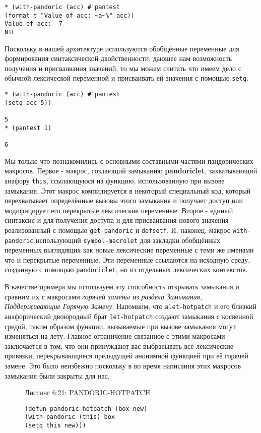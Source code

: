 \begin{verbatim}
* (with-pandoric (acc) #'pantest
(format t "Value of acc: ~a~%" acc))
Value of acc: -7
NIL
\end{verbatim}

Поскольку в нашей архитектуре используются обобщённые переменные для формирования синтаксической двойственности, дающее нам возможность получения и присваивания значений, то мы можем считать что имеем дело с обычной лексической переменной и присваивать ей значения с помощью \verb"setq":

\begin{verbatim}
* (with-pandoric (acc) #'pantest
(setq acc 5))

5
* (pantest 1)

6
\end{verbatim}

Мы только что познакомились с основными составными частями пандорических макросов. Первое - макрос, создающий замыкания: {\Eng\textbf{pandoriclet}}, захватывающий анафору \verb"this", ссылающуюся на функцию, использованную при вызове замыкания. Этот макрос компилируется в некоторый специальный код, который перехватывает определённые вызовы этого замыкания и получает доступ или модифицирует его перекрытые лексические переменные. Второе - единый синтаксис и для получения доступа и для присваивания нового значения реализованный с помощью \verb"get-pandoric" и \verb"defsetf". И, наконец, макрос \verb"with-pandoric" использующий \verb"symbol-macrolet" для закладки обобщённых переменных выглядящих как новые лексические переменные с теми же именами что и перекрытые переменные. Эти переменные ссылаются на исходную среду, созданную с помощью \verb"pandoriclet", но из отдельных лексических контекстов.

В качестве примера мы используем эту способность открывать замыкания и сравним их с макросами \emph{горячей замены} из \emph{раздела Замыкания, Поддерживающие Горячую Замену}. Напомним, что \verb"alet-hotpatch" и его близкий анафорический двоюродный брат \verb"let-hotpatch" создают замыкания с косвенной средой, таким образом функции, вызываемые при вызове замыкания могут изменяться на лету. Главное ограничение связанное с этими макросами заключается в том, что они принуждают вас выбрасывать все лексические привязки, перекрывающиеся предыдущей анонимной функцией при её горячей замене. Это было неизбежно поскольку в во время написания этих макросов замыкания были закрыты для нас.

\begin{figure}Листинг 6.21: PANDORIC-HOTPATCH\label{listing_6.21}
\listbegin
\begin{verbatim}
(defun pandoric-hotpatch (box new)
(with-pandoric (this) box
(setq this new)))
\end{verbatim}
\listend
\end{figure}


